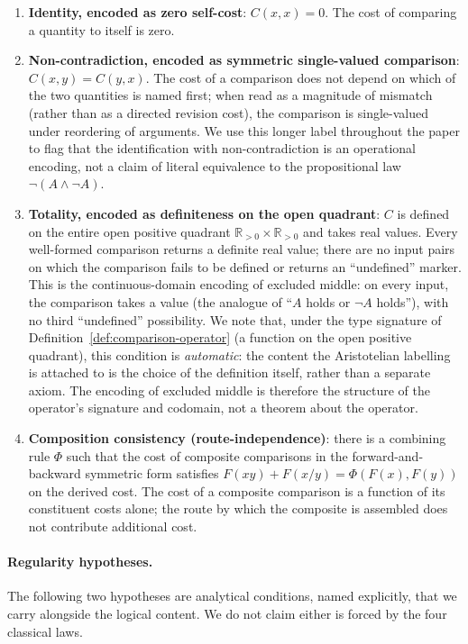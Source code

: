\documentclass[11pt,a4paper]{article}
\theoremstyle{definition}
\theoremstyle{remark}
\begin{document}
\begin{enumerate}[label=(L\arabic*), leftmargin=*]
\item \textbf{Identity, encoded as zero self-cost}: $C(x, x) = 0$.
The cost of comparing a quantity to itself is zero.
\item \textbf{Non-contradiction, encoded as symmetric single-valued
comparison}: $C(x, y) = C(y, x)$. The cost of a comparison does not
depend on which of the two quantities is named first; when read as a
magnitude of mismatch (rather than as a directed revision cost), the
comparison is single-valued under reordering of arguments. We use this
longer label throughout the paper to flag that the identification with
non-contradiction is an operational encoding, not a claim of literal
equivalence to the propositional law $\neg(A \wedge \neg A)$.
\item \textbf{Totality, encoded as definiteness on the open
quadrant}: $C$ is defined on the entire open positive quadrant
$\mathbb{R}_{>0} \times \mathbb{R}_{>0}$ and takes real values. Every
well-formed comparison returns a definite real value; there are no
input pairs on which the comparison fails to be defined or returns an
``undefined'' marker. This is the continuous-domain encoding of
excluded middle: on every input, the comparison takes a value (the
analogue of ``$A$ holds or $\neg A$ holds''), with no third
``undefined'' possibility. We note that, under the type signature of
Definition~\ref{def:comparison-operator} (a function on the open
positive quadrant), this condition is \emph{automatic}: the content
the Aristotelian labelling is attached to is the choice of the
definition itself, rather than a separate axiom. The encoding of
excluded middle is therefore the structure of the operator's signature
and codomain, not a theorem about the operator.
\item \textbf{Composition consistency (route-independence)}: there is a
combining rule $\Phi$ such that the cost of composite comparisons in the
forward-and-backward symmetric form satisfies
$F(xy) + F(x/y) = \Phi(F(x), F(y))$ on the derived cost. The cost of a
composite comparison is a function of its constituent costs alone; the
route by which the composite is assembled does not contribute additional
cost.
\end{enumerate}

\paragraph{Regularity hypotheses.} The following two hypotheses are
analytical conditions, named explicitly, that we carry alongside the
logical content. We do not claim either is forced by the four classical
laws.
\end{document}
